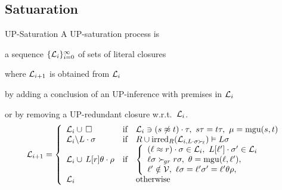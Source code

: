 \documentclass[%
handout,
]{beamer}
\begin{document}
\subsection{Satuaration}
\begin{frame}[allowframebreaks]{UP-Saturation}
        A UP-{saturation process} is

        a sequence \( \{ \mathcal{L}_i \}_{i=0}^\infty \)
        of sets of literal closures

        where \( \mathcal{L}_{i+1} \) is obtained from \( \mathcal{L}_i \)

        by {adding} a conclusion of an UP-inference with premises in $\mathcal{L}_i$

        or by {removing} a UP-redundant closure w.r.t.~\(\mathcal{L}_i\).
        \begin{gather*}
            \mathcal{L}_{i+1} = \left\{
                \begin{array}{lclc}
                    \mathcal{L}_i \cup\,\square
                    &\text{if}
                    &
                        \mathcal{L}_i\ni(s\not\approx t)\cdot\tau,\ {}
                        s\tau = t\tau,\ {}
                        \mu=\operatorname{mgu}(s,t)
                    \\
                    \mathcal{L}_i \backslash L\cdot\sigma
                    &\text{if}
                    &R \cup \operatorname{irred}_R(\mathcal{L}_{i,L\cdot\sigma\mathrel\succ_{\!\ell}}) \vDash L\sigma
                    \\
                    \mathcal{L}_i \cup\, L[r]\theta\cdot\rho
                    &\text{if}
                    &\left\{\begin{array}{l}
                        (\ell\approx r)\cdot\sigma\in\mathcal{L}_i,\ {}
                        L[\ell']\cdot\sigma'\in\mathcal{L}_i
                        \\
                        \ell\sigma\mathrel\succ_{\!gr} r\sigma,\ {}
                        \theta=\operatorname{mgu}(\ell,\ell'),
                        \\
                        \ell'\notin\mathcal{V},\ {}
                        \ell\sigma = \ell'\sigma' = \ell'\theta\rho,
                    \end{array}\right.
                    \\
                    \mathcal{L}_i
                    &&\text{otherwise}
                \end{array}
            \right.
        \end{gather*}
    \newpage


\end{frame}
\end{document}
